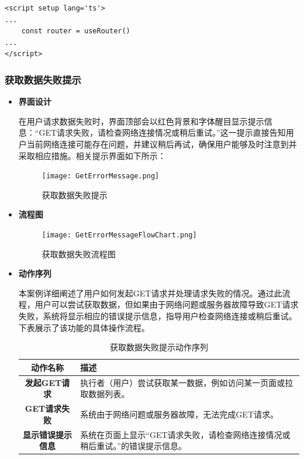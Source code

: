 \begin{itemize}
	\begin{verbatim}
<script setup lang='ts'>
...
	const router = useRouter()
...
</script>
	\end{verbatim}
	
\end{itemize}

\subsubsection{获取数据失败提示}

\begin{itemize}
	
	\item \textbf{界面设计}
	
	在用户请求数据失败时，界面顶部会以红色背景和字体醒目显示提示信息：“GET请求失败，请检查网络连接情况或稍后重试。”这一提示直接告知用户当前网络连接可能存在问题，并建议稍后再试，确保用户能够及时注意到并采取相应措施。相关提示界面如下所示：
	
	\begin{figure}[H]
		\centering
		\texttt{[image: GetErrorMessage.png]}
		\caption{获取数据失败提示}
		\label{GetErrorMessage}
	\end{figure}	
	
	\item \textbf{流程图}
	
	\begin{figure}[H]
		\centering
		\texttt{[image: GetErrorMessageFlowChart.png]}
		\caption{获取数据失败流程图}
		\label{fig:get}
	\end{figure}
	
	
	\item \textbf{动作序列}
	
	本案例详细阐述了用户如何发起GET请求并处理请求失败的情况。通过此流程，用户可以尝试获取数据，但如果由于网络问题或服务器故障导致GET请求失败，系统将显示相应的错误提示信息，指导用户检查网络连接或稍后重试。下表展示了该功能的具体操作流程。
	
	\begin{table}[H]
		\centering
		\caption{获取数据失败提示动作序列}
		\renewcommand\arraystretch{1.5}
		\begin{tabular}{|c|>{\raggedright\arraybackslash}p{10cm}|}
			\hline
			\textbf{动作名称} & \textbf{描述} \\ \hline
			\textbf{发起GET请求} & 执行者（用户）尝试获取某一数据，例如访问某一页面或拉取数据列表。 \\ \hline
			\textbf{GET请求失败} & 系统由于网络问题或服务器故障，无法完成GET请求。 \\ \hline
			\textbf{显示错误提示信息} & 系统在页面上显示“GET请求失败，请检查网络连接情况或稍后重试。”的错误提示信息。 \\ \hline
		\end{tabular}
	\end{table}
	

\end{itemize}
